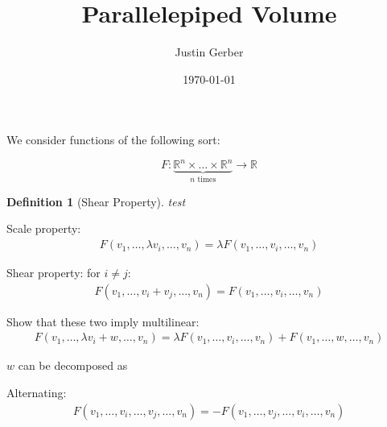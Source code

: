 \documentclass[12pt]{article}
\theoremstyle{break}
\newtheorem{definition}{Definition}[section]
\theoremstyle{break}
\theoremstyle{break}
\theoremstyle{break}
\begin{document}
\title{Parallelepiped Volume}
\author{Justin Gerber}
\date{\today}
\maketitle

We consider functions of the following sort:

$$
F: \underbrace{\mathbb{R}^n \times \ldots \times \mathbb{R}^n}_{n \text{ times}} \to \mathbb{R}
$$


\begin{definition}[Shear Property]
test
\end{definition}
Scale property:
\begin{align}
F(v_1, \ldots, \lambda v_i, \ldots, v_n) = \lambda F(v_1, \ldots, v_i, \ldots, v_n)
\end{align}

Shear property: for $i\neq j$:
\begin{align}
F(v_1, \ldots, v_i + v_j, \ldots, v_n) = F(v_1,\ldots, v_i, \ldots, v_n)
\end{align}

Show that these two imply multilinear:
\begin{align}
F(v_1, \ldots, \lambda v_i + w, \ldots, v_n) = \lambda F(v_1, \ldots, v_i, \ldots, v_n) + F(v_1, \ldots, w, \ldots, v_n)
\end{align}



$w$ can be decomposed as 



Alternating:
\begin{align}
F(v_1, \ldots, v_i, \ldots, v_j, \ldots, v_n) = - F(v_1, \ldots, v_j, \ldots, v_i, \ldots, v_n)
\end{align}
\end{document}
